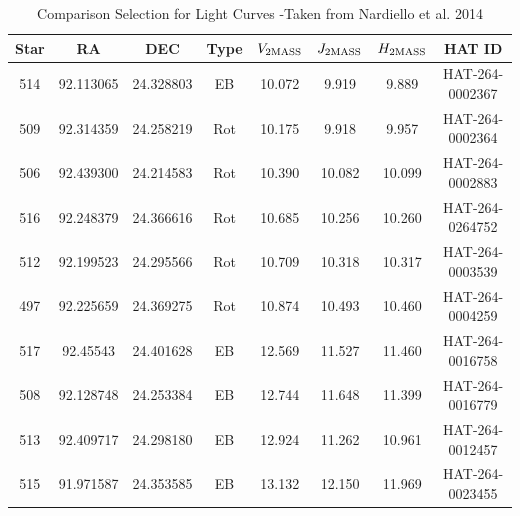 \begin{table}[]
\centering
\label{my-label}
\begin{tabular}{|c|c|c|c|c|c|c|c|}
\hline
\textbf{Star} & \textbf{RA} & \textbf{DEC} & \textbf{Type} & \textbf{$V_{\rm 2MASS}$} & \textbf{$J_{\rm 2MASS}$} & \textbf{$H_{\rm 2MASS}$} & \textbf{HAT ID} \\ \hline
514           & 92.113065   & 24.328803        & EB            & 10.072            & 9.919             & 9.889             & HAT-264-0002367 \\ \hline
509           & 92.314359   & 24.258219        & Rot           & 10.175            & 9.918             & 9.957             & HAT-264-0002364 \\ \hline
506           & 92.439300   & 24.214583        & Rot           & 10.390            & 10.082            & 10.099            & HAT-264-0002883 \\ \hline
516           & 92.248379   & 24.366616        & Rot           & 10.685            & 10.256            & 10.260            & HAT-264-0264752 \\ \hline
512           & 92.199523   & 24.295566        & Rot           & 10.709            & 10.318            & 10.317            & HAT-264-0003539 \\ \hline
497           & 92.225659   & 24.369275        & Rot           & 10.874            & 10.493            & 10.460            & HAT-264-0004259 \\ \hline
517           & 92.45543    & 24.401628        & EB            & 12.569            & 11.527            & 11.460            & HAT-264-0016758 \\ \hline
508           & 92.128748   & 24.253384       & EB   		   & 12.744            & 11.648             & 11.399             & HAT-264-0016779 \\ \hline
513           & 92.409717   & 24.298180        & EB            & 12.924             & 11.262              & 10.961             & HAT-264-0012457 \\ \hline
515           & 91.971587   & 24.353585       & EB             & 13.132 & 12.150	           & 11.969              & HAT-264-0023455 \\ \hline

\end{tabular}
\caption{Comparison Selection for Light Curves  -Taken from Nardiello et al. 2014}
\label{Nard}
\end{table}

